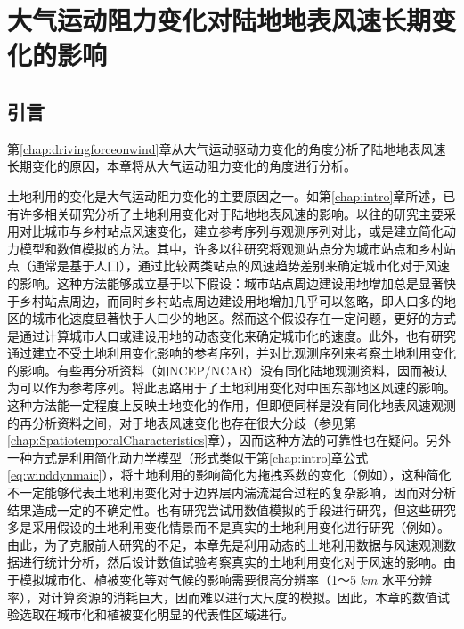 \chapter{大气运动阻力变化对陆地地表风速长期变化的影响}\label{chap:dragingforceonwind}

\section{引言}

第\ref{chap:drivingforceonwind}章从大气运动驱动力变化的角度分析了陆地地表风速长期变化的原因，本章将从大气运动阻力变化的角度进行分析。

土地利用的变化是大气运动阻力变化的主要原因之一。如第\ref{chap:intro}章所述，已有许多相关研究分析了土地利用变化对于陆地地表风速的影响\citep{vautard2010northern, wu2016estimating, kalnay2003impact, guo2011changes}。以往的研究主要采用对比城市与乡村站点风速变化，建立参考序列与观测序列对比，或是建立简化动力模型和数值模拟的方法。其中，许多以往研究将观测站点分为城市站点和乡村站点（通常是基于人口），通过比较两类站点的风速趋势差别来确定城市化对于风速的影响\citep{guo2011changes}。这种方法能够成立基于以下假设：城市站点周边建设用地增加总是显著快于乡村站点周边，而同时乡村站点周边建设用地增加几乎可以忽略，即人口多的地区的城市化速度显著快于人口少的地区。然而这个假设存在一定问题，更好的方式是通过计算城市人口或建设用地的动态变化来确定城市化的速度。此外，也有研究通过建立不受土地利用变化影响的参考序列，并对比观测序列来考察土地利用变化的影响。有些再分析资料（如NCEP/NCAR）没有同化陆地观测资料，因而被认为可以作为参考序列\citep{kalnay2003impact}。\citet{zha2017effects}将此思路用于了土地利用变化对中国东部地区风速的影响。这种方法能一定程度上反映土地变化的作用，但即便同样是没有同化地表风速观测的再分析资料之间，对于地表风速变化也存在很大分歧（参见第\ref{chap:SpatiotemporalCharacteristics}章），因而这种方法的可靠性也在疑问。另外一种方式是利用简化动力学模型（形式类似于第\ref{chap:intro}章公式 \ref{eq:winddynmaic}），将土地利用的影响简化为拖拽系数的变化（例如\citet{wu2016estimating}），这种简化不一定能够代表土地利用变化对于边界层内湍流混合过程的复杂影响，因而对分析结果造成一定的不确定性。也有研究尝试用数值模拟的手段进行研究，但这些研究多是采用假设的土地利用变化情景而不是真实的土地利用变化进行研究（例如\citet{vautard2010northern}）。由此，为了克服前人研究的不足，本章先是利用动态的土地利用数据与风速观测数据进行统计分析，然后设计数值试验考察真实的土地利用变化对于风速的影响。由于模拟城市化、植被变化等对气候的影响需要很高分辨率（1～5 $km$ 水平分辨率），对计算资源的消耗巨大，因而难以进行大尺度的模拟。因此，本章的数值试验选取在城市化和植被变化明显的代表性区域进行。

